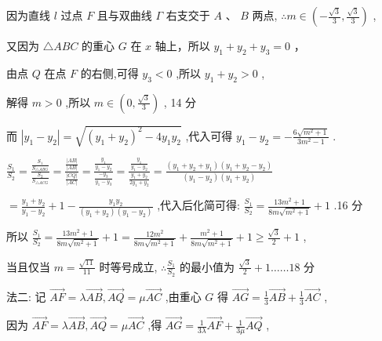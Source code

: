 \documentclass[10pt]{article}
\begin{document}
因为直线 \(l\) 过点 \(F\) 且与双曲线 \(\Gamma\) 右支交于 \(A\text{ 、 }B\) 两点, \(\therefore m \in  \left( {-\frac{\sqrt{3}}{3},\frac{\sqrt{3}}{3}}\right)\) ,

又因为 \(\bigtriangleup  {ABC}\) 的重心 \(G\) 在 \(x\) 轴上，所以 \({y}_{1} + {y}_{2} + {y}_{3} = 0\) ，

由点 \(Q\) 在点 \(F\) 的右侧,可得 \({y}_{3} < 0\) ,所以 \({y}_{1} + {y}_{2} > 0\) ,

解得 \(m > 0\) ,所以 \(m \in  \left( {0,\frac{\sqrt{3}}{3}}\right)\) , 14 分

而 \(\left| {{y}_{1} - {y}_{2}}\right|  = \sqrt{{\left( {y}_{1} + {y}_{2}\right) }^{2} - 4{y}_{1}{y}_{2}}\) ,代入可得 \({y}_{1} - {y}_{2} =  - \frac{6\sqrt{{m}^{2} + 1}}{3{m}^{2} - 1}\) .

\(\frac{{S}_{1}}{{S}_{2}} = \frac{\frac{{S}_{1}}{{S}_{\bigtriangleup {ABG}}}}{\frac{{S}_{2}}{{S}_{\bigtriangleup {ACG}}}} = \frac{\frac{\left| AB\right| }{\left| AB\right| }}{\frac{\left| CQ\right| }{\left| AC\right| }} = \frac{\frac{{y}_{1}}{{y}_{1} - {y}_{2}}}{\frac{-{y}_{3}}{{y}_{1} - {y}_{3}}} = \frac{\frac{{y}_{1}}{{y}_{1} - {y}_{2}}}{\frac{{y}_{1} + {y}_{2}}{2{y}_{1} + {y}_{2}}} = \frac{\left( {{y}_{1} + {y}_{2} + {y}_{1}}\right) \left( {{y}_{1} + {y}_{2} - {y}_{2}}\right) }{\left( {{y}_{1} - {y}_{2}}\right) \left( {{y}_{1} + {y}_{2}}\right) }\)

\(= \frac{{y}_{1} + {y}_{2}}{{y}_{1} - {y}_{2}} + 1 - \frac{{y}_{1}{y}_{2}}{\left( {{y}_{1} + {y}_{2}}\right) \left( {{y}_{1} - {y}_{2}}\right) }\) ,代入后化简可得: \(\frac{{S}_{1}}{{S}_{2}} = \frac{{13}{m}^{2} + 1}{{8m}\sqrt{{m}^{2} + 1}} + 1\) .16 分

所以 \(\frac{{S}_{1}}{{S}_{2}} = \frac{{13}{m}^{2} + 1}{{8m}\sqrt{{m}^{2} + 1}} + 1 = \frac{{12}{m}^{2}}{{8m}\sqrt{{m}^{2} + 1}} + \frac{{m}^{2} + 1}{{8m}\sqrt{{m}^{2} + 1}} + 1 \geq  \frac{\sqrt{3}}{2} + 1\) ,

当且仅当 \(m = \frac{\sqrt{11}}{11}\) 时等号成立, \(\therefore \frac{{S}_{1}}{{S}_{2}}\) 的最小值为 \(\frac{\sqrt{3}}{2} + 1\ldots \ldots {18}\) 分

法二: 记 \(\overrightarrow{AF} = \lambda \overrightarrow{AB},\overrightarrow{AQ} = \mu \overrightarrow{AC}\) ,由重心 \(G\) 得 \(\overrightarrow{AG} = \frac{1}{3}\overrightarrow{AB} + \frac{1}{3}\overrightarrow{AC}\) ,

因为 \(\overrightarrow{AF} = \lambda \overrightarrow{AB},\overrightarrow{AQ} = \mu \overrightarrow{AC}\) ,得 \(\overrightarrow{AG} = \frac{1}{3\lambda }\overrightarrow{AF} + \frac{1}{3\mu }\overrightarrow{AQ}\) ,
\end{document}
